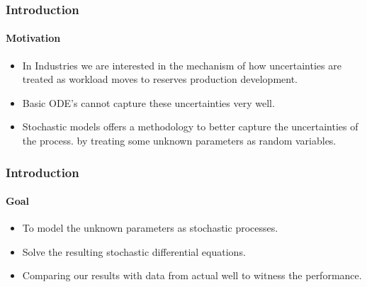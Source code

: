 \documentclass[11pt]{beamer}
\begin{document}
\begin{frame}
\frametitle{Introduction}
\framesubtitle{Motivation}
\begin{itemize}
\item In Industries we are interested in the mechanism of how uncertainties are treated as workload moves to reserves production development.
\item Basic ODE's cannot capture these uncertainties very well.
\item Stochastic models offers a methodology to better capture the uncertainties of the process. by treating some unknown parameters as random variables.  

\end{itemize}

\end{frame}
\begin{frame}

\frametitle{Introduction}
\framesubtitle{Goal}
\begin{itemize}
\item To model the unknown parameters as stochastic processes.
\item Solve the resulting stochastic differential equations.
\item Comparing our results with data from actual well to witness the performance.
\end{itemize}
\end{frame}
\end{document}
